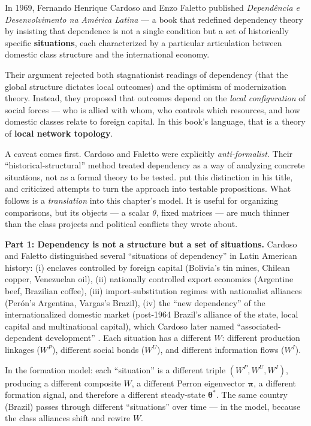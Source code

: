 \documentclass[../structural_economics_book.tex]{subfiles}
\begin{document}
In 1969, Fernando Henrique Cardoso and Enzo Faletto published \textit{Depend\^{e}ncia e Desenvolvimento na Am\'{e}rica Latina} \citep{cardoso1969dependencia} --- a book that redefined dependency theory by insisting that dependence is not a single condition but a set of historically specific \textbf{situations}, each characterized by a particular articulation between domestic class structure and the international economy.

Their argument rejected both stagnationist readings of dependency (that the global structure dictates local outcomes) and the optimism of modernization theory. Instead, they proposed that outcomes depend on the \textit{local configuration} of social forces --- who is allied with whom, who controls which resources, and how domestic classes relate to foreign capital. In this book's language, that is a theory of \textbf{local network topology}.

A caveat comes first. Cardoso and Faletto were explicitly \textit{anti-formalist}. Their ``historical-structural'' method treated dependency as a way of analyzing concrete situations, not as a formal theory to be tested. \citet{palma1978dependency} put this distinction in his title, and \citet[``The Consumption of Dependency Theory in the United States'', \textit{LARR}]{cardoso1977consumption} criticized attempts to turn the approach into testable propositions. What follows is a \textit{translation} into this chapter's model. It is useful for organizing comparisons, but its objects --- a scalar $\theta$, fixed matrices --- are much thinner than the class projects and political conflicts they wrote about.

\textbf{Part 1: Dependency is not a structure but a set of situations.} Cardoso and Faletto distinguished several ``situations of dependency'' in Latin American history: (i) enclaves controlled by foreign capital (Bolivia's tin mines, Chilean copper, Venezuelan oil), (ii) nationally controlled export economies (Argentine beef, Brazilian coffee), (iii) import-substitution regimes with nationalist alliances (Per\'{o}n's Argentina, Vargas's Brazil), (iv) the ``new dependency'' of the internationalized domestic market (post-1964 Brazil's alliance of the state, local capital and multinational capital), which Cardoso later named ``associated-dependent development'' \citep{cardoso1973associated}. Each situation has a different $W$: different production linkages ($W^P$), different social bonds ($W^U$), and different information flows ($W^I$).

In the formation model: each ``situation'' is a different triple $(W^P, W^U, W^I)$, producing a different composite $W$, a different Perron eigenvector $\boldsymbol{\pi}$, a different formation signal, and therefore a different steady-state $\boldsymbol{\theta}^*$. The same country (Brazil) passes through different ``situations'' over time --- in the model, because the class alliances shift and rewire $W$.
\end{document}
